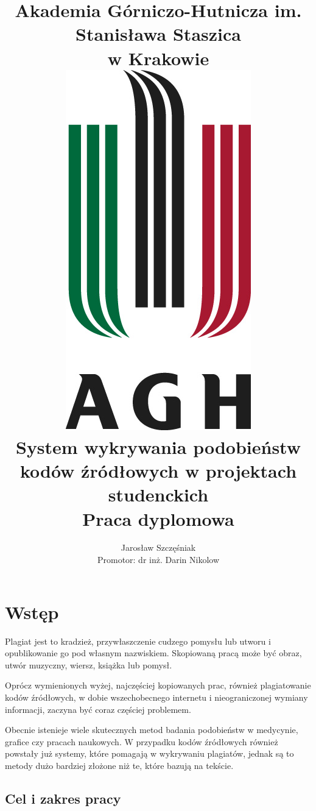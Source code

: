 \documentclass[a4paper,12pt]{article}
\title
{
	\Large
	Akademia Górniczo-Hutnicza im. Stanisława Staszica \\ w Krakowie \\
	\vspace{10 mm}
	\includegraphics[scale=0.8]{gfx/agh.jpg} \\
	\textbf{ System wykrywania podobieństw kodów źródłowych w projektach studenckich } \\
	Praca dyplomowa \\
	\vspace{10 mm}
}
\author
{
	\vspace{10 mm}
	Jarosław Szczęśniak \\
	Promotor: dr inż. Darin Nikolow
	\vspace{10 mm}
}
\begin{document}

\lstset{escapechar=@,style=customjava}

\renewcommand{\labelitemi}{$\bullet$}
\renewcommand{\labelitemii}{$\circ$}
\renewcommand{\labelitemiii}{\tiny$\blacksquare$}
\renewcommand{\labelitemiv}{$\diamond$}

\maketitle

\newpage\thispagestyle{empty}
\mbox{}
\newpage

\tableofcontents
 
\newpage

\section{Wstęp}

Plagiat jest to kradzież, przywłaszczenie cudzego pomysłu lub utworu i opublikowanie go pod własnym nazwiskiem. Skopiowaną pracą może być obraz, utwór muzyczny, wiersz, książka lub pomysł\cite{plagiat}.

Oprócz wymienionych wyżej, najczęściej kopiowanych prac, również plagiatowanie kodów źródłowych, w dobie wszechobecnego internetu i nieograniczonej wymiany informacji, zaczyna być coraz częściej problemem.

Obecnie istenieje wiele skutecznych metod badania podobieństw w medycynie, grafice czy pracach naukowych. W przypadku kodów źródłowych również powstały już systemy, które pomagają w wykrywaniu plagiatów, jednak są to metody dużo bardziej złożone niż te, które bazują na tekście.

\subsection{Cel i zakres pracy}
\end{document}
